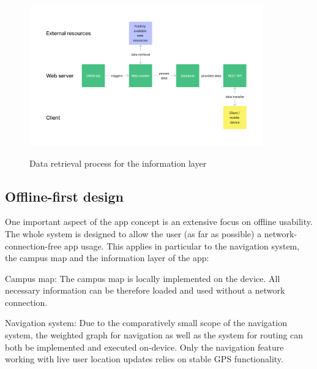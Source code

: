 \begin{figure}[H]
	\centering
	\includegraphics[width=0.9\textwidth]{images/data_retrieval_process.png}\\
	\caption{Data retrieval process for the information layer}
\end{figure}


\subsection{Offline-first design}
One important aspect of the app concept is an extensive focus on offline usability. The whole system is designed to allow the user (as far as possible) a network-connection-free app usage. This applies in particular to the navigation system, the campus map and the information layer of the app:

Campus map: The campus map is locally implemented on the device. All necessary information can be therefore loaded and used without a network connection.

Navigation system: Due to the comparatively small scope of the navigation system, the weighted graph for navigation as well as the system for routing can both be implemented and executed on-device. Only the navigation feature working with live user location updates relies on stable GPS functionality.

